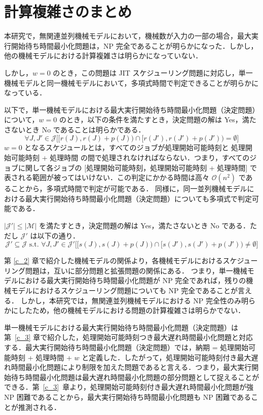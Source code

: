 \documentclass[12pt]{optlab-bachelor}
\begin{document}
\section{計算複雑さのまとめ}\label{4_s_2}
本研究で，無関連並列機械モデルにおいて，機械数が入力の一部の場合，最大実行開始待ち時間最小化問題は，NP 完全であることが明らかになった．しかし，他の機械モデルにおける計算複雑さは明らかになっていない．

しかし，$w = 0$ のとき，この問題は JIT スケジューリング問題に対応し，単一機械モデルと同一機械モデルにおいて，多項式時間で判定できることが明らかになっている．

以下で，単一機械モデルにおける最大実行開始待ち時間最小化問題（決定問題）について，$w = 0$ のとき，以下の条件を満たすとき，決定問題の解は Yes，満たさないとき No であることは明らかである．
$$\forall J,J' \in \mathcal{J}\bigg[\big[r(J),r(J) + p(J)\big) \cap \big[r(J'),r(J') + p(J')\big) = \emptyset\bigg]$$
$w = 0$ となるスケジュールとは，すべてのジョブが処理開始可能時刻と 処理開始可能時刻 + 処理時間 の間で処理されなければならない．つまり，すべてのジョブに関して各ジョブの [処理開始可能時刻，処理開始可能時刻 + 処理時間] で表される範囲が被ってはいけない．この判定にかかる時間は高々 $\mathcal{O}(n^2)$ であることから，多項式時間で判定が可能である．
同様に，同一並列機械モデルにおける最大実行開始待ち時間最小化問題（決定問題）についても多項式で判定可能である．

$|\mathcal{J}'| \le |\mathcal{M}|$ を満たすとき，決定問題の解は Yes，満たさないとき No である．ただし $\mathcal{J}'$ は以下の通り．
$$\mathcal{J}' \subseteq \mathcal{J} \text{ s.t. }\forall J,J' \in \mathcal{J}'\bigg[\big[s(J),s(J) + p(J)\big) \cap \big[s(J'),s(J') + p(J')\big) \neq \emptyset\bigg]$$

第 \ref{c_2} 章で紹介した機械モデルの関係より，各機械モデルにおけるスケジューリング問題は，互いに部分問題と拡張問題の関係にある．
つまり，単一機械モデルにおける最大実行開始待ち時間最小化問題が NP 完全であれば，残りの機械モデルにおけるスケジューリング問題についても NP 完全であることが言える．
しかし，本研究では，無関連並列機械モデルにおける NP 完全性のみ明らかにしたため，他の機械モデルにおける問題の計算複雑さは明らかでない．

単一機械モデルにおける最大実行開始待ち時間最小化問題（決定問題）は第~\ref{c_3} 章で紹介した，処理開始可能時刻つき最大遅れ時間最小化問題と対応する．最大実行開始待ち時間最小化問題（決定問題）では，納期 = 処理開始可能時刻 + 処理時間 + $w$ と定義した．したがって，処理開始可能時刻付き最大遅れ時間最小化問題により制限を加えた問題であると言える．つまり，最大実行開始待ち時間最小化問題は最大遅れ時間最小化問題の部分問題として捉えることができる．第~\ref{c_3}~章より，処理開始可能時刻付き最大遅れ時間最小化問題が強 NP 困難であることから，最大実行開始待ち時間最小化問題も NP 困難であることが推測される．
\end{document}
